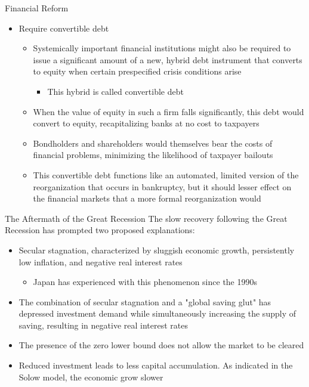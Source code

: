 \documentclass[aspectratio=1610]{beamer}
\begin{document}
\begin{frame}[wide]{Financial Reform}
	\begin{itemize}
		\item Require convertible debt
		\begin{itemize}
			\item Systemically important financial institutions might also be required to issue a significant amount of a new, hybrid debt instrument that converts to equity when certain prespecified crisis conditions arise
			\begin{itemize}
				\item This hybrid is called convertible debt
			\end{itemize}
			\item When the value of equity in such a firm falls significantly, this debt would convert to equity, recapitalizing banks at no cost to taxpayers
			\item Bondholders and shareholders would themselves bear the costs of financial problems, minimizing the likelihood of taxpayer bailouts
			\item This convertible debt functions like an automated, limited version of the reorganization that occurs in bankruptcy, but it should lesser effect on the financial markets that a more formal reorganization would 
		\end{itemize} 
	\end{itemize}
\end{frame}

\begin{frame}[wide]{The Aftermath of the Great Recession}
	The slow recovery following the Great Recession has prompted two proposed explanations:
	\begin{itemize}
		\item Secular stagnation, characterized by sluggish economic growth, persistently low inflation, and negative real interest rates
		\begin{itemize}
			\item Japan has experienced with this phenomenon since the 1990s
		\end{itemize}
		\item The combination of secular stagnation and a "global saving glut" has depressed investment demand while simultaneously increasing the supply of saving, resulting in negative real interest rates
		\item The presence of the zero lower bound does not allow the market to be cleared
		\item Reduced investment leads to less capital accumulation. As indicated in the Solow model, the economic grow slower
	\end{itemize}
	
\end{frame}
\end{document}
